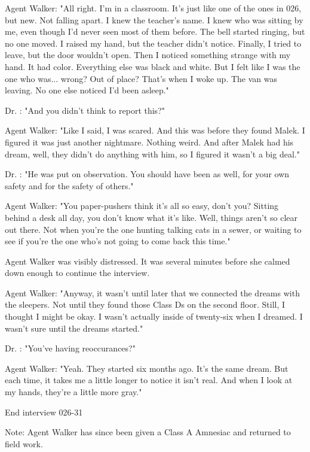 Agent Walker: "All right. I'm in a classroom. It's just like one of the ones in 026, but new. Not falling apart. I knew the teacher's name. I knew who was sitting by me, even though I'd never seen most of them before. The bell started ringing, but no one moved. I raised my hand, but the teacher didn't notice. Finally, I tried to leave, but the door wouldn't open. Then I noticed something strange with my hand. It had color. Everything else was black and white. But I felt like I was the one who was... wrong? Out of place? That's when I woke up. The van was leaving. No one else noticed I'd been asleep."

Dr. : "And you didn't think to report this?"

Agent Walker: "Like I said, I was scared. And this was before they found Malek. I figured it was just another nightmare. Nothing weird. And after Malek had his dream, well, they didn't do anything with him, so I figured it wasn't a big deal."

Dr. : "He was put on observation. You should have been as well, for your own safety and for the safety of others."

Agent Walker: "You paper-pushers think it's all so easy, don't you? Sitting behind a desk all day, you don't know what it's like. Well, things aren't so clear out there. Not when you're the one hunting talking cats in a sewer, or waiting to see if you're the one who's not going to come back this time."

Agent Walker was visibly distressed. It was several minutes before she calmed down enough to continue the interview.

Agent Walker: "Anyway, it wasn't until later that we connected the dreams with the sleepers. Not until they found those Class Ds on the second floor. Still, I thought I might be okay. I wasn't actually inside of twenty-six when I dreamed. I wasn't sure until the dreams started."

Dr. : "You've having reoccurances?"

Agent Walker: "Yeah. They started six months ago. It's the same dream. But each time, it takes me a little longer to notice it isn't real. And when I look at my hands, they're a little more gray."

End interview 026-31

Note: Agent Walker has since been given a Class A Amnesiac and returned to field work.